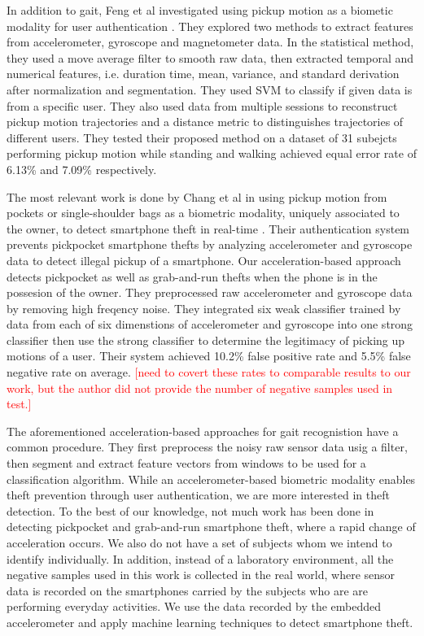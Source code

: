 \documentclass{soups}
\begin{document}
In addition to gait, Feng et al investigated using pickup motion as a biometic modality for user authentication \cite{feng:pickup}. 
They explored two methods to extract features from accelerometer, gyroscope and magnetometer data. 
In the statistical method, they used a move average filter to smooth raw data, then extracted temporal and numerical features, i.e. duration time, mean, variance, and standard derivation after normalization and segmentation. 
They used SVM to classify if given data is from a specific user. 
They also used data from multiple sessions to reconstruct pickup motion trajectories and a distance metric to distinguishes trajectories of different users. 
They tested their proposed method on a dataset of 31 subejcts performing pickup motion while standing and walking achieved equal error rate of 6.13\% and 7.09\% respectively.

The most relevant work is done by Chang et al in using pickup motion from pockets or single-shoulder bags as a biometric modality, uniquely associated to the owner, to detect smartphone theft in real-time \cite{cheng:theft}. 
Their authentication system prevents pickpocket smartphone thefts by analyzing accelerometer and gyroscope data to detect illegal pickup of a smartphone. 
Our acceleration-based approach detects pickpocket as well as grab-and-run thefts when the phone is in the possesion of the owner. 
They preprocessed raw accelerometer and gyroscope data by removing high freqency noise. 
They integrated six weak classifier trained by data from each of six dimenstions of accelerometer and gyroscope into one strong classifier then use the strong classifier to determine the legitimacy of picking up motions of a user. 
Their system achieved 10.2\% false positive rate and 5.5\% false negative rate on average. \textcolor{red}{ [need to covert these rates to comparable results to our work, but the author did not provide the number of negative samples used in test.]} 

The aforementioned acceleration-based approaches for gait recognistion have a common procedure. 
They first preprocess the noisy raw sensor data usig a filter, then segment and extract feature vectors from windows to be used for a classification algorithm. 
While an accelerometer-based biometric modality enables theft prevention through user authentication, we are more interested in theft detection. 
To the best of our knowledge, not much work has been done in detecting pickpocket and grab-and-run smartphone theft, where a rapid change of acceleration occurs. 
We also do not have a set of subjects whom we intend to identify individually. 
In addition, instead of a laboratory environment, all the negative samples used in this work is collected in the real world, where sensor data is recorded on the smartphones carried by the subjects who are are performing everyday activities. 
We use the data recorded by the embedded accelerometer and apply machine learning techniques to detect smartphone theft.
\end{document}
